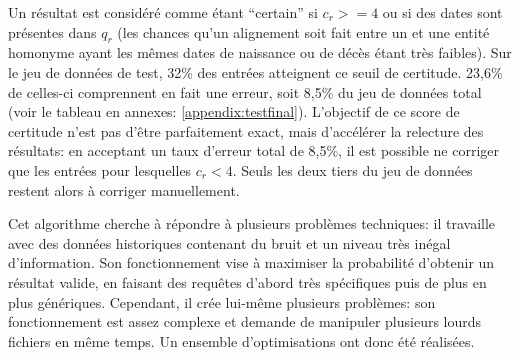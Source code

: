 \bigskip
Un résultat est considéré comme étant \enquote{certain} si \(c_{r} >= 4\) ou si des dates sont présentes dans \(q_r\) (les chances qu'un alignement soit fait entre un \tname{} et une entité homonyme ayant les mêmes dates de naissance ou de décès étant très faibles). Sur le jeu de données de test, 32\% des entrées atteignent ce seuil de certitude. 23,6\% de celles-ci comprennent en fait une erreur, soit 8,5\% du jeu de données total (voir le tableau en annexes: \ref{appendix:testfinal}). L'objectif de ce score de certitude n'est pas d'être parfaitement exact, mais d'accélérer la relecture des résultats: en acceptant un taux d'erreur total de 8,5\%, il est possible ne corriger que les entrées pour lesquelles \(c_r < 4\). Seuls les deux tiers du jeu de données restent alors à corriger manuellement.

Cet algorithme cherche à répondre à plusieurs problèmes techniques: il travaille avec des données historiques contenant du bruit et un niveau très inégal d'information. Son fonctionnement vise à maximiser la probabilité d'obtenir un résultat valide, en faisant des requêtes d'abord très spécifiques puis de plus en plus génériques. Cependant, il crée lui-même plusieurs problèmes: son fonctionnement est assez complexe et demande de manipuler plusieurs lourds fichiers en même temps. Un ensemble d'optimisations ont donc été réalisées.

